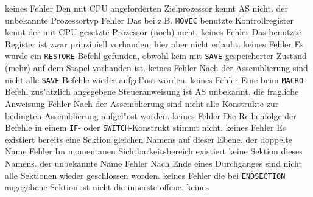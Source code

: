 \documentclass[12pt,a4paper,twoside]{report}
\newcommand{\tty}[1]{{\tt #1}}
\begin{document}
{\begin{description}
               {keines}
               {Fehler}
               {Den mit CPU angeforderten Zielprozessor kennt AS
                nicht.}
               {der unbekannte Prozessortyp}
               {Fehler}
               {Das bei z.B. \tty{MOVEC} benutzte
	        Kontrollregister  kennt der mit CPU gesetzte Prozessor
	        (noch) nicht.}
               {keines}
               {Fehler}
               {Das benutzte Register ist zwar prinzipiell
                vorhanden, hier aber nicht erlaubt.}
               {keines}
               {Fehler}
               {Es wurde ein \tty{RESTORE}-Befehl gefunden, obwohl
                kein mit \tty{SAVE} gespeicherter Zustand (mehr) auf dem Stapel
                vorhanden ist.}
               {keines}
               {Fehler}
               {Nach der Assemblierung sind nicht alle
                \tty{SAVE}-Befehle wieder aufgel"ost worden.}
               {keines}
               {Fehler}
               {Eine beim \tty{MACRO}-Befehl zus"atzlich angegebene
                Steueranweisung ist AS unbekannt.}
               {die fragliche Anweisung}
               {Fehler}
               {Nach der Assemblierung sind nicht alle
                Konstrukte zur bedingten Assemblierung aufgel"ost
                worden.}
               {keines}
               {Fehler}
               {Die Reihenfolge der Befehle in einem \tty{IF}-
	        oder \tty{SWITCH}-Konstrukt stimmt nicht.}
               {keines}
               {Fehler}
               {Es existiert bereits eine Sektion gleichen
                Namens auf dieser Ebene.}
               {der doppelte Name}
               {Fehler}
               {Im momentanen Sichtbarkeitsbereich existiert
                keine Sektion dieses Namens.}
               {der unbekannte Name}
               {Fehler}
               {Nach Ende eines Durchganges sind nicht alle
                Sektionen wieder geschlossen worden.}
               {keines}
               {Fehler}
               {die bei \tty{ENDSECTION} angegebene Sektion
	        ist nicht die innerste offene.}
               {keines}

\end{description}}
\end{document}
